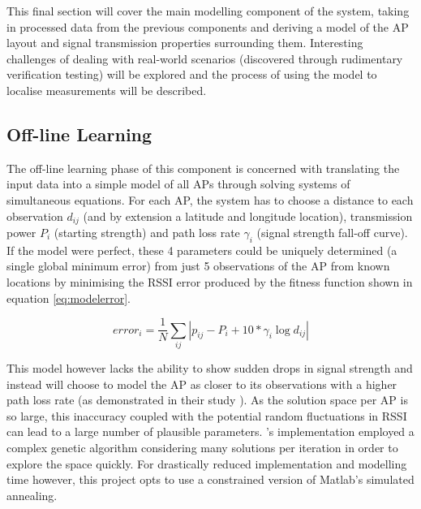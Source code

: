 \documentclass{UoYCSproject}
\begin{document}
            This final section will cover the main modelling component of the system, taking in processed data from the previous components and deriving a model of the AP layout and signal transmission properties surrounding them. Interesting challenges of dealing with real-world scenarios (discovered through rudimentary verification testing) will be explored and the process of using the model to localise measurements will be described.
        
            \subsection{Off-line Learning}
            
                The off-line learning phase of this component is concerned with translating the input data into a simple model of all APs through solving systems of simultaneous equations. For each AP, the system has to choose a distance to each observation $d_{ij}$ (and by extension a latitude and longitude location), transmission power $P_i$ (starting strength) and path loss rate $\gamma_i$ (signal strength fall-off curve). If the model were perfect, these 4 parameters could be uniquely determined (a single global minimum error) from just 5 observations of the AP from known locations by minimising the RSSI error produced by the fitness function shown in equation \ref{eq:modelerror}.
                
                \begin{equation}
                \label{eq:modelerror}
                    error_i = \frac{1}{N}\sum_{ij}|p_{ij} - P_i + 10*\gamma_i\log{d_{ij}}|
                \end{equation}
                
                This model however lacks the ability to show sudden drops in signal strength and instead will choose to model the AP as closer to its observations with a higher path loss rate (as demonstrated in their study \citep{chintalapudi2010indoor}). As the solution space per AP is so large, this inaccuracy coupled with the potential random fluctuations in RSSI can lead to a large number of plausible parameters. \citeauthor{chintalapudi2010indoor}'s implementation employed a complex genetic algorithm considering many solutions per iteration in order to explore the space quickly. For drastically reduced implementation and modelling time however, this project opts to use a constrained version of Matlab's simulated annealing.
                
\end{document}
